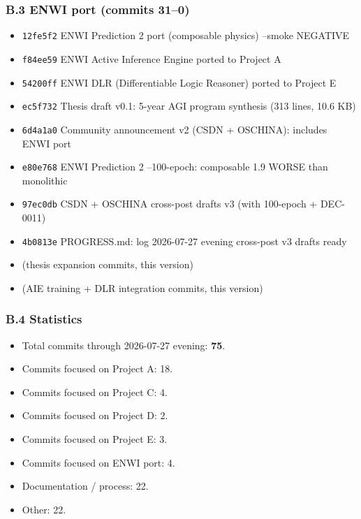 \documentclass[11pt]{article}
\begin{document}
\subsubsection{B.3 ENWI port (commits 31--0)}

\begin{itemize}
  \item \texttt{12fe5f2} ENWI Prediction 2 port (composable physics) --smoke NEGATIVE
  \item \texttt{f84ee59} ENWI Active Inference Engine ported to Project A
  \item \texttt{54200ff} ENWI DLR (Differentiable Logic Reasoner) ported to Project E
  \item \texttt{ec5f732} Thesis draft v0.1: 5-year AGI program synthesis (313 lines, 10.6 KB)
  \item \texttt{6d4a1a0} Community announcement v2 (CSDN + OSCHINA): includes ENWI port
  \item \texttt{e80e768} ENWI Prediction 2 --100-epoch: composable 1.9 WORSE than monolithic
  \item \texttt{97ec0db} CSDN + OSCHINA cross-post drafts v3 (with 100-epoch + DEC-0011)
  \item \texttt{4b0813e} PROGRESS.md: log 2026-07-27 evening cross-post v3 drafts ready
  \item (thesis expansion commits, this version)
  \item (AIE training + DLR integration commits, this version)
\end{itemize}


\subsubsection{B.4 Statistics}

\begin{itemize}
  \item Total commits through 2026-07-27 evening: \textbf{75}.
  \item Commits focused on Project A: 18.
  \item Commits focused on Project C: 4.
  \item Commits focused on Project D: 2.
  \item Commits focused on Project E: 3.
  \item Commits focused on ENWI port: 4.
  \item Documentation / process: 22.
  \item Other: 22.
\end{itemize}
\end{document}
